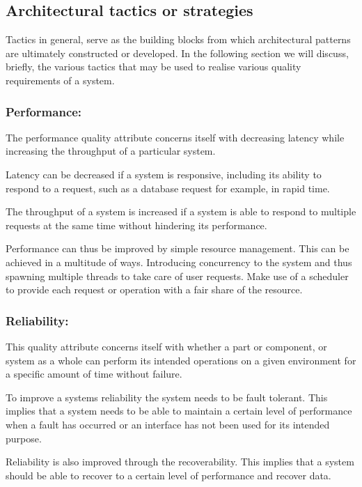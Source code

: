 \documentclass[a4paper,12pt]{article}
\begin{document}
\subsection{Architectural tactics or strategies}
\begin{flushleft}
	Tactics in general, serve as the building blocks from which architectural patterns are ultimately constructed or developed. In the following section we will discuss, briefly, the various tactics that may be used to realise various quality requirements of a system. 
	
	\subsubsection{Performance:}
	The performance quality attribute concerns itself with decreasing latency while increasing the throughput of a particular system.
	
	Latency can be decreased if a system is responsive, including its ability to respond to a request, such as a database request for example, in rapid time.
	
	The throughput of a system is increased if a system is able to respond to multiple requests at the same time without hindering its performance.
	
	Performance can thus be improved by simple resource management. This can be achieved in a multitude of ways. Introducing concurrency to the system and thus spawning multiple threads to take care of user requests. Make use of a scheduler to provide each request or operation with a fair share of the resource. 
	
	\subsubsection{Reliability:}
	This quality attribute concerns itself with whether a part or component, or system as a whole can perform its intended operations on a given environment for a specific amount of time without failure.
	
	To improve a systems reliability the system needs to be fault tolerant. This implies that a system needs to be able to maintain a certain level of performance when a fault has occurred or an interface has not been used for its intended purpose. 
	
	Reliability is also improved through the recoverability. This implies that a system should be able to recover to a certain level of performance and recover data. 
	

\end{flushleft}
\end{document}
